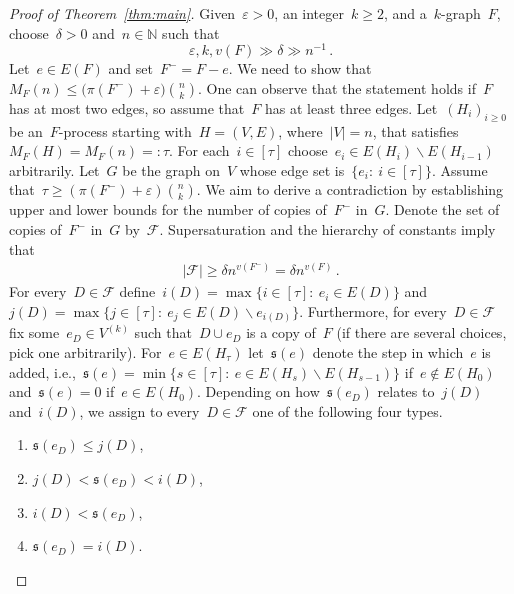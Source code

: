 \documentclass[reqno, 12pt]{amsart}
\numberwithin{equation}{section}
\numberwithin{figure}{section}
\let\setminus=\smallsetminus
\newcommand{\cF}{\mathcal{F}}
\theoremstyle{plain}
\theoremstyle{note}
\theoremstyle{remark}
\begin{document}
    \begin{proof}[Proof of Theorem~\ref{thm:main}]
        Given~$\varepsilon>0$, an integer~$k\geq2$, and a~$k$-graph~$F$, choose~$\delta>0$ and~$n\in\mathds{N}$ such that $$\varepsilon,k,v(F)\gg\delta\gg n^{-1}\,.$$
        Let~$e\in E(F)$ and set~$F^-=F-e$.
        We need to show that~$M_F(n)
         \leq
         \big(\pi(F^-)+\varepsilon\big)\binom{n}{k}$.
        One can observe that the statement holds if~$F$ has at most two edges, so assume that~$F$ has at least three edges.
        Let~$(H_i)_{i\geq0}$ be an~$F$-process starting with~$H=(V,E)$, where~$\vert V\vert=n$, that satisfies~$M_F(H)= M_F(n)=:\tau$.
        For each~$i\in[\tau]$ choose~$e_i\in E(H_i)\setminus E(H_{i-1})$ arbitrarily.
        Let~$G$ be the graph on~$V$ whose edge set is~$\{e_i:\:i\in[\tau]\}$.
        Assume that~$\tau\geq(\pi(F^-)+\varepsilon)\binom{n}{k}$.
        We aim to derive a contradiction by establishing upper and lower bounds for the number of copies of~$F^-$ in~$G$.
        Denote the set of copies of~$F^-$ in~$G$ by~$\cF$.
        Supersaturation and the hierarchy of constants imply that
        \begin{align}\label{eq:Flower}
            \vert\cF\vert\geq\delta n^{v(F^-)}=\delta n^{v(F)}\,.
        \end{align}
        For every~$D\in\cF$ define~$i(D)=\max\{i\in[\tau]:\:e_i\in E(D)\}$ and~$j(D)=\max\{j\in[\tau]:\:e_j\in E(D)\setminus e_{i(D)}\}$.
        Furthermore, for every~$D\in\cF$ fix some~$e_D\in V^{(k)}$ such that~$D \cup e_D$ is a copy of~$F$ (if there are several choices, pick one arbitrarily).
        For~$e\in E(H_{\tau})$ let~$\mathfrak{s}(e)$ denote the step in which~$e$ is added, i.e.,~$\mathfrak{s}(e)=\min\{s\in[\tau]:\:e\in E(H_s)\setminus E(H_{s-1})\}$ if~$e\notin E(H_0)$ and~$\mathfrak{s}(e)=0$ if~$e\in E(H_0)$.
        Depending on how~$\mathfrak{s}(e_D)$ relates to~$j(D)$ and~$i(D)$, we assign to every~$D \in \cF$ one of the following four types.
        \begin{enumerate}[leftmargin=1.95cm]
            \item[Type~$1$:]\label{it:type1}
            $\mathfrak{s}(e_D)\leq j(D)$,
            \item[Type~$2$:]\label{it:type2}
            $j(D)< \mathfrak{s}(e_D)< i(D)$,
            \item[Type~$3$:]\label{it:type3}
            $i(D) < \mathfrak{s}(e_D)$,
            \item[Type~$4$:]\label{it:type4}
            $\mathfrak{s}(e_D)=i(D)$.
        \end{enumerate}


\end{proof}
\end{document}
